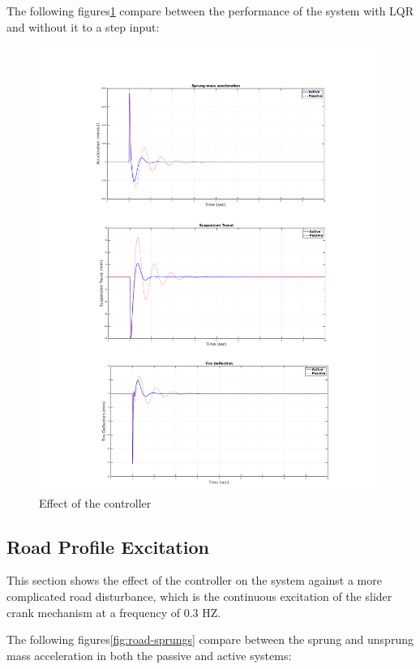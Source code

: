 \newpage
The following figures\ref{fig:all-step} compare between the performance of the system with LQR and without it to a step input: 
\begin{figure}[H]
	\centering
	\includegraphics[trim=0cm 0cm 0cm 2cm, clip, width=1\linewidth]{figures/p-a-step.pdf}
	\caption{Effect of the controller}
	\label{fig:all-step}
\end{figure}

\newpage
\subsection{Road Profile Excitation}
This section shows the effect of the controller on the system against a more complicated road disturbance, which is the continuous excitation of the slider crank mechanism at a frequency of 0.3 HZ.

The following figures\ref{fig:road-sprungs} compare between the sprung and unsprung mass acceleration in both the passive and active systems:

